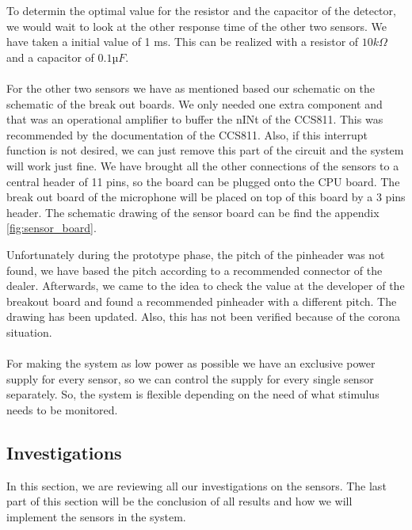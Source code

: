 \documentclass[11pt,a4paper]{article}
\begin{document}
To determin the optimal value for the resistor and the capacitor of the detector, we would wait to look at the other response time of the other two sensors. We have taken a initial value of 1 ms. This can be realized with a resistor of $ 10 k\Omega$ and a capacitor of $0.1 µF$.
\\ \\
For the other two sensors we have as mentioned based our schematic on the schematic of the break out boards. We only needed one extra component and that was an operational amplifier to buffer the nINt of the CCS811. This was recommended by the documentation of the CCS811. Also, if this interrupt function is not desired, we can just remove this part of the circuit and the system will work just fine. We have brought all the other connections of the sensors to a central header of 11 pins, so the board can be plugged onto the CPU board. The break out board of the microphone will be placed on top of this board by a 3 pins header.  The schematic drawing of the sensor board can be find the appendix \ref{fig:sensor_board}.

Unfortunately during the prototype phase, the pitch of the pinheader was not found, we have based the pitch according to a recommended connector of the dealer. Afterwards, we came to the idea to check the value at the developer of the breakout board and found a recommended pinheader with a different pitch. The drawing has been updated. Also, this has not been verified because of the corona situation.
\\ \\
For making the system as low power as possible we have an exclusive power supply for every sensor, so we can control the supply for every single sensor separately.
So, the system is flexible depending on the need of what stimulus needs to be monitored.

\subsection{Investigations}
In this section, we are reviewing all our investigations on the sensors. The last part of this section will be the conclusion of all results and how we will implement the sensors in the system.
\end{document}
